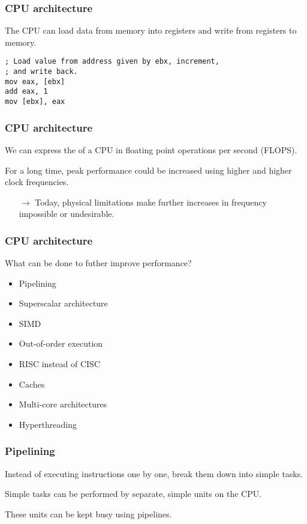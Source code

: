 \documentclass[12pt,t]{beamer}
\let\emph\relax %
\newcommand{\conclude}[1]{%
  \begin{itemize}
    \item[$\rightarrow$]#1
  \end{itemize}
}
\begin{document}
  \begin{frame}[fragile]
    \frametitle{CPU architecture}

    The CPU can load data from memory into registers and write from registers to memory.

    \begin{lstlisting}[frame=single]
; Load value from address given by ebx, increment,
; and write back.
mov eax, [ebx]
add eax, 1
mov [ebx], eax
    \end{lstlisting}
  \end{frame}

  \begin{frame}[fragile]
    \frametitle{CPU architecture}

    We can express the \emph{peak performance} of a CPU in floating point operations per second (FLOPS).

    For a long time, peak performance could be increased using higher and higher clock frequencies.

    \conclude{Today, physical limitations make further increases in frequency impossible or undesirable.}
  \end{frame}

  \begin{frame}[fragile]
    \frametitle{CPU architecture}

    What can be done to futher improve performance?

    \begin{itemize}
      \item Pipelining
      \item Superscalar architecture
      \item SIMD
      \item Out-of-order execution
      \item RISC instead of CISC
      \item Caches
      \item Multi-core architectures
      \item Hyperthreading
    \end{itemize}
  \end{frame}

  \begin{frame}[fragile]
    \frametitle{Pipelining}

    Instead of executing instructions one by one, break them down into simple tasks.

    Simple tasks can be performed by separate, simple units on the CPU.

    These units can be kept busy using pipelines.
  \end{frame}
\end{document}
